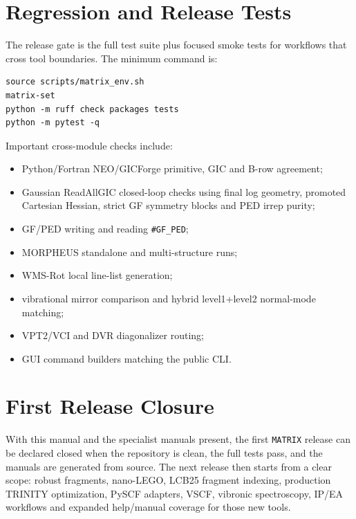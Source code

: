 \documentclass[11pt]{article}
\newcommand{\framework}{\texttt{MATRIX}}
\newcommand{\sectionname}[1]{\texttt{\##1}}
\begin{document}
\section{Regression and Release Tests}

The release gate is the full test suite plus focused smoke tests for workflows
that cross tool boundaries.  The minimum command is:

\begin{lstlisting}[style=matrix]
source scripts/matrix_env.sh
matrix-set
python -m ruff check packages tests
python -m pytest -q
\end{lstlisting}

Important cross-module checks include:

\begin{itemize}
  \item Python/Fortran NEO/GICForge primitive, GIC and B-row agreement;
  \item Gaussian ReadAllGIC closed-loop checks using final log geometry,
        promoted Cartesian Hessian, strict GF symmetry blocks and PED irrep
        purity;
  \item GF/PED writing and reading \sectionname{GF\_PED};
  \item MORPHEUS standalone and multi-structure runs;
  \item WMS-Rot local line-list generation;
  \item vibrational mirror comparison and hybrid level1+level2 normal-mode
        matching;
  \item VPT2/VCI and DVR diagonalizer routing;
  \item GUI command builders matching the public CLI.
\end{itemize}

\section{First Release Closure}

With this manual and the specialist manuals present, the first \framework{}
release can be declared closed when the repository is clean, the full tests
pass, and the manuals are generated from source.  The next release then starts
from a clear scope: robust fragments, nano-LEGO, LCB25 fragment indexing,
production TRINITY optimization, PySCF adapters, VSCF, vibronic spectroscopy,
IP/EA workflows and expanded help/manual coverage for those new tools.
\end{document}
